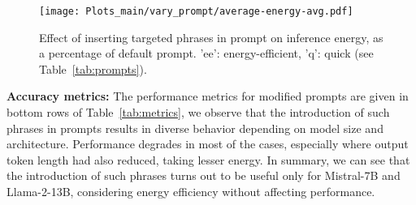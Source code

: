 



\begin{figure}[!t]
\centering
{\texttt{[image: Plots\_main/vary\_prompt/average-energy-avg.pdf]}\label{fig:vary-prompt-energy}}
\caption{Effect of inserting targeted phrases in prompt on inference energy, as a percentage of default prompt. 'ee': energy-efficient, 'q': quick (see Table~\ref{tab:prompts}). }%
\label{fig:vary-prompt-averages}
\end{figure}




\vspace{1mm}
\noindent \textbf{Accuracy metrics:} 
The performance metrics for modified prompts are given in bottom rows of Table~\ref{tab:metrics}, we observe that the introduction of such phrases in prompts results in diverse behavior depending on model size and architecture. 
Performance degrades in most of the cases, especially where output token length had also reduced, taking lesser energy.
In summary, we can see that the introduction of such phrases turns out to be useful only for Mistral-7B and Llama-2-13B, considering energy efficiency without affecting performance.   








